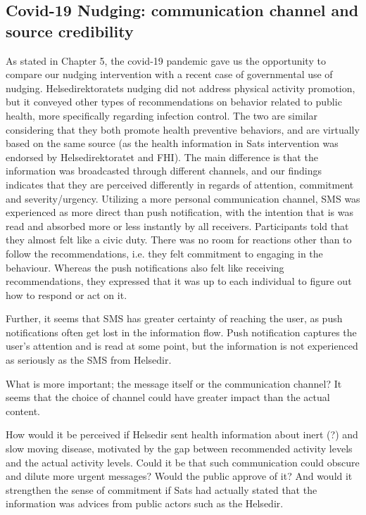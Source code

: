 \subsection{Covid-19 Nudging: communication channel and source credibility}
As stated in Chapter 5, the covid-19 pandemic gave us the opportunity to compare our nudging intervention with a recent case of governmental use of nudging. Helsedirektoratets nudging did not address physical activity promotion, but it conveyed other types of recommendations on behavior related to public health, more specifically regarding infection control. The two are similar considering that they both promote health preventive behaviors, and are virtually based on the same source (as the health information in Sats intervention was endorsed by Helsedirektoratet and FHI). The main difference is that the information was broadcasted through different channels, and our findings indicates that they are perceived differently in regards of attention, commitment and severity/urgency. Utilizing a more personal communication channel, SMS was experienced as more direct than push notification, with the intention that is was read and absorbed more or less instantly by all receivers. Participants told that they almost felt like a civic duty. There was no room for reactions other than to follow the recommendations, i.e. they felt commitment to engaging in the behaviour. Whereas the push notifications also felt like receiving recommendations, they expressed that it was up to each individual to figure out how to respond or act on it. 

Further, it seems that SMS has greater certainty of reaching the user, as push notifications often get lost in the information flow. Push notification captures the user's attention and is read at some point, but the information is not experienced as seriously as the SMS from Helsedir. 

What is more important; the message itself or the communication channel? It seems that the choice of channel could have greater impact than the actual content. 

How would it be perceived if Helsedir sent health information about inert (?) and slow moving disease, motivated by the gap between recommended activity levels and the actual activity levels. Could it be that such communication could obscure and dilute more urgent messages? Would the public approve of it? And would it strengthen the sense of commitment if Sats had actually stated that the information was advices from public actors such as the Helsedir. 

